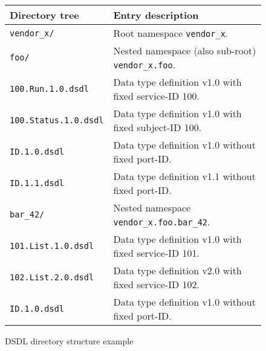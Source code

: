 \begin{remark}
    \begin{figure}[H]
        \begin{tabu}{|l|X|} \hline
            \rowfont{\bfseries}
            Directory tree & Entry description \\\hline

            \texttt{vendor\_x/} &
            Root namespace \texttt{vendor\_x}. \\

            \texttt{\qquad{}foo/} &
            Nested namespace (also sub-root) \texttt{vendor\_x.foo}. \\

            \texttt{\qquad{}\qquad{}100.Run.1.0.dsdl} &
            Data type definition v1.0 with fixed service-ID 100. \\

            \texttt{\qquad{}\qquad{}100.Status.1.0.dsdl} &
            Data type definition v1.0 with fixed subject-ID 100. \\

            \texttt{\qquad{}\qquad{}ID.1.0.dsdl} &
            Data type definition v1.0 without fixed port-ID. \\

            \texttt{\qquad{}\qquad{}ID.1.1.dsdl} &
            Data type definition v1.1 without fixed port-ID. \\

            \texttt{\qquad{}\qquad{}bar\_42/} &
            Nested namespace \texttt{vendor\_x.foo.bar\_42}. \\

            \texttt{\qquad{}\qquad{}\qquad{}101.List.1.0.dsdl} &
            Data type definition v1.0 with fixed service-ID 101. \\

            \texttt{\qquad{}\qquad{}\qquad{}102.List.2.0.dsdl} &
            Data type definition v2.0 with fixed service-ID 102. \\

            \texttt{\qquad{}\qquad{}\qquad{}ID.1.0.dsdl} &
            Data type definition v1.0 without fixed port-ID. \\\hline
        \end{tabu}
        \caption{DSDL directory structure example}\label{fig:dsdl_directory_structure_example}
    \end{figure}
\end{remark}

